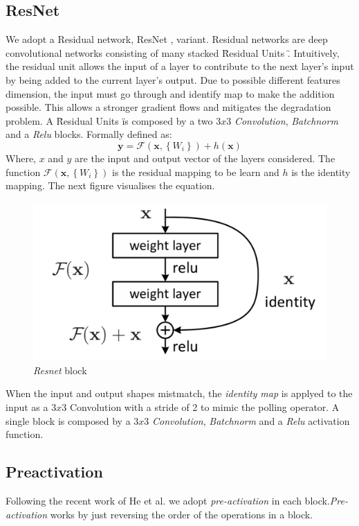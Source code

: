 \documentclass[../document.tex]{subfiles}
\begin{document}
\subsection{ResNet}
We adopt a Residual network, ResNet \cite{he2015deep}, variant. Residual networks are deep convolutional networks consisting of many stacked \" Residual Units \". Intuitively, the residual unit allows the input of a layer to contribute to the next layer's input by being added to the current layer's output. Due to possible different features dimension, the input must go through and identify map to make the addition possible. This allows a stronger gradient flows and mitigates the degradation problem. A \"Residual Units \" is composed by a two $3x3$ \emph{Convolution}, \emph{Batchnorm} \cite{ioffe2015batch} and a \emph{Relu} blocks. Formally defined as: 
\begin{equation}
    \mathbf{y}=\mathcal{F}\left(\mathbf{x},\left\{W_{i}\right\}\right)+h(\mathbf{x})
    \label{eq : resnet}
\end{equation}
Where, $x$ and $y$ are the input and output vector of the layers considered. The function $\mathcal{F}\left(\mathbf{x},\left\{W_{i}\right\}\right)$ is the residual mapping to be learn and $h$ is the identity mapping. The next figure visualises the equation.
\begin{figure}[htbp]
    \centering
    \includegraphics[scale=0.3]{../img/implementation/estimator/resnet_block.png}
    \caption{\emph{Resnet} block \cite{he2015deep}}
\end{figure}
When the input and output shapes mistmatch, the \emph{identity map} is applyed to the input as a $3x3$ Convolution with a stride of 2 to mimic the polling operator. A single block is composed by a $3x3$ \emph{Convolution}, \emph{Batchnorm} and a \emph{Relu} activation function. 
\subsection{Preactivation}
Following the recent work of He et al. \cite{he2015identity} we adopt \emph{pre-activation} in each block.\emph{Pre-activation} works by just reversing the order of the operations in a block.
\end{document}
